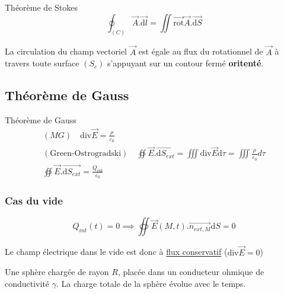\begin{Theorem}{Théorème de Stokes}{}
\begin{equation}
  \oint _{(C)} \overrightarrow{A}. \overrightarrow{\mathrm{d}l} = \iint\overrightarrow{\mathrm{rot}} \overrightarrow{A}. \overrightarrow{\mathrm{d}S}
\end{equation}

La circulation du champ vectoriel $\overrightarrow{A}$ est égale au flux du rotationnel de $\overrightarrow{A}$ à travers toute surface $(S_c)$ s'appuyant sur un contour fermé \textbf{oritenté}.
\end{Theorem}



\subsection{Théorème de Gauss} %
\label{sub:Théorème de Gauss}
\begin{Theorem}{Théorème de Gauss}{}
\begin{gather}
  (MG) \quad \mathrm{div} \overrightarrow{E} = \frac{\rho}{\varepsilon_0}  \\
  (\text{Green-Ostrogradski}) \quad \oiint \overrightarrow{E} . \overrightarrow{\mathrm{d} S _{ext}} = \iiint \mathrm{div} \overrightarrow{E} \mathrm{d} \tau = \iiint \frac{\rho}{ \varepsilon_0} d\tau \\
  \boxed{\oiint \overrightarrow{E} . \overrightarrow{\mathrm{d} S _{ext}} = \frac{ Q _{int}
  }{\varepsilon_0} }
\end{gather}
\end{Theorem}

\subsubsection{Cas du vide} %
\label{sec:Cas du vide}
\begin{equation}
  Q _{int}  (t) = 0 \implies \oiint \overrightarrow{E}(M,t) . \overrightarrow{n _{ext, M}} \mathrm{d} S = 0
\end{equation}

Le champ électrique dans le vide est donc à \underline{flux conservatif} ($\mathrm{div} \overrightarrow{E} = 0$)

\begin{Example}{}{}
Une sphère chargée de rayon $R$, placée dans un conducteur ohmique de conductivité $\gamma$. La charge totale de la sphère évolue avec le temps. 
\end{Example}

